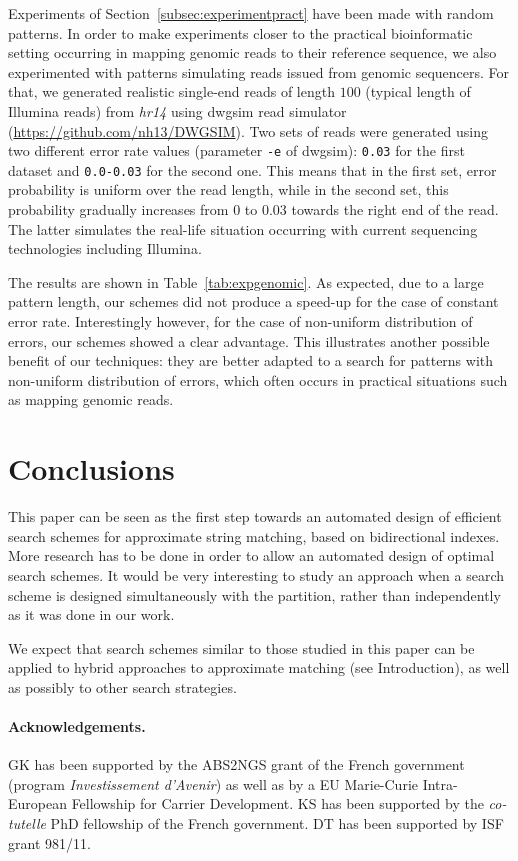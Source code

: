 \documentclass[12pt]{article}
\begin{document}
Experiments of Section~\ref{subsec:experimentpract} have been made with
random patterns. In order to make experiments closer to 
the practical bioinformatic setting 
occurring in mapping genomic reads to their
reference sequence, we also experimented with patterns simulating
reads issued from genomic sequencers. For that, 
we generated realistic single-end reads of length $100$ (typical length of {\sc
  Illumina} reads) from \emph{hr14} 
using {\sc dwgsim} read simulator
(\url{https://github.com/nh13/DWGSIM}). Two sets of reads were
generated using two different error rate
values (parameter \texttt{-e} of {\sc dwgsim}): \texttt{0.03} for the
first dataset and \texttt{0.0-0.03} for the second one. This means
that in the first set, error probability is uniform over the read
length, while in the second set, this probability gradually increases from $0$
to $0.03$ towards the right end of the read. The latter simulates
the real-life situation occurring with current sequencing
technologies including {\sc Illumina}. 


The results are shown in Table~\ref{tab:expgenomic}. As expected, due
to a large pattern length, our schemes did not produce a speed-up for
the case of constant error rate. 
Interestingly however,
for the case of non-uniform distribution of errors, our schemes showed
a clear advantage. 
This illustrates another possible benefit of our techniques: they are
better adapted to a search for patterns with non-uniform
distribution of errors, which often occurs in practical situations
such as mapping genomic reads. 

\section{Conclusions} This paper can be seen as the first step towards an automated design
of efficient search schemes for approximate string matching, based on
bidirectional indexes. More research has to be done in order to allow
an automated design of optimal search schemes. 
It would be very interesting to study an approach when a search scheme
is designed simultaneously with the partition, rather than
independently as it was done in our work. 

We expect that search schemes similar to those studied in this paper
can be applied to hybrid approaches to approximate matching (see Introduction), as well
as possibly to other search strategies. 





\paragraph{Acknowledgements.}
GK has been supported by the ABS2NGS grant of the French government
(program \emph{Investissement d'Avenir}) as well as by a EU Marie-Curie
Intra-European Fellowship for Carrier Development.
KS has been supported by the \emph{co-tutelle} PhD fellowship of the French
government.
DT has been supported by ISF grant 981/11.


\end{document}
